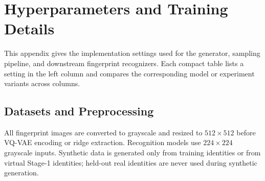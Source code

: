 \documentclass{article}
\begin{document}
\appendix

\section{Hyperparameters and Training Details}
\label{app:training_details}

This appendix gives the implementation settings used for the generator,
sampling pipeline, and downstream fingerprint recognizers.  Each compact table
lists a setting in the left column and compares the corresponding model or
experiment variants across columns.

\subsection{Datasets and Preprocessing}

All fingerprint images are converted to grayscale and resized to
$512\times512$ before VQ-VAE encoding or ridge extraction.  Recognition models
use $224\times224$ grayscale inputs.  Synthetic data is generated only from
training identities or from virtual Stage-1 identities; held-out real identities
are never used during synthetic generation.
\end{document}
